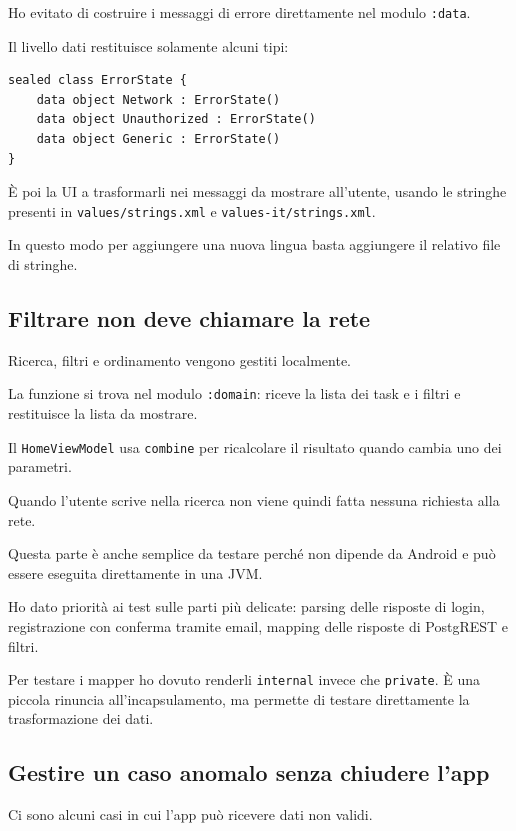 \documentclass[11pt,a4paper]{article}
\begin{document}
Ho evitato di costruire i messaggi di errore direttamente nel modulo
\texttt{:data}.

Il livello dati restituisce solamente alcuni tipi:

\begin{lstlisting}
sealed class ErrorState {
    data object Network : ErrorState()
    data object Unauthorized : ErrorState()
    data object Generic : ErrorState()
}
\end{lstlisting}

È poi la UI a trasformarli nei messaggi da mostrare all'utente, usando le
stringhe presenti in \texttt{values/strings.xml} e
\texttt{values-it/strings.xml}.

In questo modo per aggiungere una nuova lingua basta aggiungere il relativo
file di stringhe.


\subsection{Filtrare non deve chiamare la rete}

Ricerca, filtri e ordinamento vengono gestiti localmente.

La funzione si trova nel modulo \texttt{:domain}: riceve la lista dei task e i
filtri e restituisce la lista da mostrare.

Il \texttt{HomeViewModel} usa \texttt{combine} per ricalcolare il risultato
quando cambia uno dei parametri.

Quando l'utente scrive nella ricerca non viene quindi fatta nessuna richiesta
alla rete.

Questa parte è anche semplice da testare perché non dipende da Android e può
essere eseguita direttamente in una JVM.

Ho dato priorità ai test sulle parti più delicate: parsing delle risposte di
login, registrazione con conferma tramite email, mapping delle risposte di
PostgREST e filtri.

Per testare i mapper ho dovuto renderli \texttt{internal} invece che
\texttt{private}. È una piccola rinuncia all'incapsulamento, ma permette di
testare direttamente la trasformazione dei dati.


\subsection{Gestire un caso anomalo senza chiudere l'app}

Ci sono alcuni casi in cui l'app può ricevere dati non validi.
\end{document}
